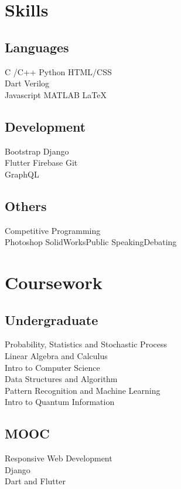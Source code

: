 \documentclass{deedy-resume-openfont}
\begin{document}
\begin{minipage}[t]{0.33\textwidth}
\section{Skills}
\subsection{Languages}
\textbullet{}C /C++\textbullet{} Python \textbullet{} HTML/CSS \\\textbullet{} Dart \textbullet{} Verilog \\
\textbullet{}Javascript\textbullet{} MATLAB \textbullet{}LaTeX\\
\sectionsep
\subsection{Development}
 \textbullet{}Bootstrap \textbullet{}Django\\
 \textbullet{}Flutter \textbullet{}Firebase
 \textbullet{}Git\\\textbullet{} GraphQL\\
\sectionsep
\subsection{Others}
 \textbullet{}Competitive Programming \\\textbullet{}Photoshop\textbullet{} SolidWorks\textbullet{}Public Speaking\textbullet{}Debating\\
\sectionsep


\section{Coursework}

\subsection{Undergraduate}
Probability, Statistics and Stochastic Process \\
Linear Algebra and Calculus \\
Intro to Computer Science \\
Data Structures and Algorithm\\
Pattern Recognition and Machine Learning\\
Intro to Quantum Information\\

\sectionsep

\subsection{MOOC}
Responsive Web Development\\
Django \\
Dart and Flutter \\
\sectionsep




%
%

\end{minipage} 
\end{document}
